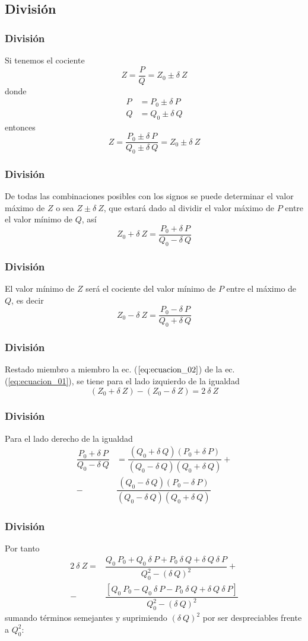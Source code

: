 \subsection*{División}
\begin{frame}
\frametitle{División}
Si tenemos el cociente
\[ Z = \dfrac{P}{Q} = Z_{0} \pm \delta \: Z \]
donde
\begin{align*}
P &= P_{0} \pm \delta \: P \\
Q &= Q_{0} \pm \delta \: Q
\end{align*}
\pause
entonces
\[ Z = \dfrac{P_{0} \pm \delta \: P}{Q_{0} \pm \delta \: Q} = Z_{0} \pm \delta \: Z \]
\end{frame}
\begin{frame}
\frametitle{División}
De todas las combinaciones posibles con los signos se puede determinar el valor máximo de $Z$ o sea $Z \pm \delta \: Z$, que estará dado al dividir el valor máximo de $P$ entre el valor mínimo de $Q$, así
\begin{equation}
Z_{0} + \delta \: Z = \dfrac{P_{0} + \delta \: P}{Q_{0} - \delta \: Q}
\label{eq:ecuacion_01}
\end{equation}
\end{frame}
\begin{frame}
\frametitle{División}
 El valor mínimo de $Z$ será el cociente del valor mínimo de $P$ entre el máximo de $Q$, es decir
\begin{equation}
Z_{0} - \delta \: Z = \dfrac{P_{0} - \delta \: P}{Q_{0} + \delta \: Q}
\label{eq:ecuacion_02}
\end{equation}
\end{frame}
\begin{frame}
\frametitle{División}
Restado miembro a miembro la ec. ($\ref{eq:ecuacion_02}$) de la ec. (\ref{eq:ecuacion_01}), se tiene para el lado izquierdo de la igualdad
\[ (Z_{0} + \delta \: Z) - (Z_{0} - \delta \: Z) = 2 \: \delta \: Z \]
\end{frame}
\begin{frame}
\frametitle{División}
Para el lado derecho de la igualdad
\begin{align*}
\dfrac{P_{0} + \delta \: P}{Q_{0} - \delta \: Q} &= \dfrac{(Q_{0} + \delta \: Q)(P_{0} + \delta \: P)}{(Q_{0} - \delta \: Q)(Q_{0} + \delta \: Q)} + \\
-& \dfrac{(Q_{0} - \delta \: Q)(P_{0} - \delta \: P)}{(Q_{0} - \delta \: Q)(Q_{0} + \delta \: Q)}
\end{align*}
\end{frame}
\begin{frame}
\frametitle{División}
Por tanto
\begin{align*}
2 \: \delta \: Z = &{} \dfrac{Q_{0} \: P_{0} + Q_{0} \: \delta \: P + P_{0} \: \delta \: Q + \delta \: Q \: \delta \: P}{Q_{0}^{2} - (\delta \: Q)^{2}} + \\
-& \dfrac{[Q_{0} \: P_{0} - Q_{0} \: \delta \: P - P_{0} \: \delta \: Q + \delta \: Q \: \delta \: P]}{Q_{0}^{2} - (\delta \: Q)^{2}}
\end{align*}
sumando términos semejantes y suprimiendo $(\delta \: Q)^{2}$ por ser despreciables frente a $Q_{0}^{2}$:
\end{frame}
